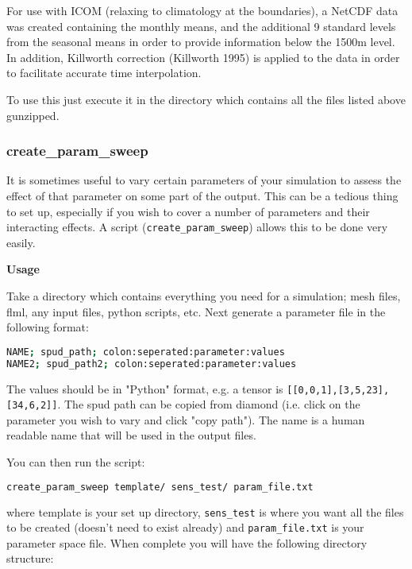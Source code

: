 For use with ICOM (relaxing to climatology at the boundaries), a NetCDF data was created containing the monthly means, and the additional 9 standard levels from the seasonal means in order to provide information below the 1500m level. In addition, Killworth correction (Killworth 1995) is applied to the data in order to facilitate accurate time interpolation.

To use this just execute it in the directory which contains all the files listed above gunzipped.

\subsubsection{create\_param\_sweep}
\label{sec:create_param_sweep}

It is sometimes useful to vary certain parameters of your simulation to assess the effect of 
that parameter on some part of the output. This can be a tedious thing to set up, especially 
if you wish to cover a number of parameters and their interacting effects.
A script (\lstinline[language = Bash]+create_param_sweep+) allows this to be done very easily.

\textbf{Usage}

Take a directory which contains everything you need for a simulation; mesh files, 
flml, any input files, python scripts, etc. Next generate a parameter file in the following format:

\begin{lstlisting}[language = Bash]
NAME; spud_path; colon:seperated:parameter:values
NAME2; spud_path2; colon:seperated:parameter:values
\end{lstlisting}

The values should be in "Python" format, e.g. a tensor is 
\lstinline[language = Bash]+[[0,0,1],[3,5,23],[34,6,2]]+. 
The spud path can be copied from diamond (i.e. click on the parameter you wish to vary
and click "copy path"). The name is a human readable name that will be used in the output files.

You can then run the script:

\begin{lstlisting}[language = Bash]
create_param_sweep template/ sens_test/ param_file.txt 
\end{lstlisting}

where template is your set up directory, \lstinline[language = Bash]+sens_test+ 
is where you want all the files to be created 
(doesn't need to exist already) and \lstinline[language = Bash]+param_file.txt+ is your parameter space file.
When complete you will have the following directory structure:

